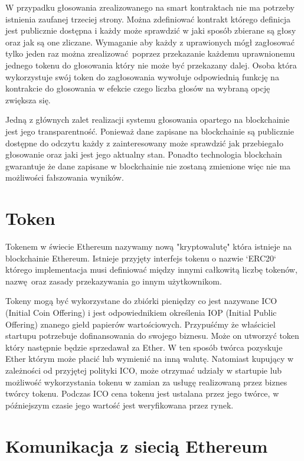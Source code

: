 \documentclass[]{llncs}
\begin{document}
  W przypadku głosowania zrealizowanego na smart kontraktach nie ma potrzeby
  istnienia zaufanej trzeciej strony. Można zdefiniować kontrakt którego
  definicja jest publicznie dostępna i każdy może sprawdzić w jaki sposób
  zbierane są głosy oraz jak są one zliczane. Wymaganie aby każdy z uprawionych
  mógł zagłosować tylko jeden raz można zrealizować poprzez przekazanie każdemu
  uprawnionemu jednego tokenu do głosowania który nie może być przekazany dalej.
  Osoba która wykorzystuje swój token do zagłosowania wywołuje odpowiednią
  funkcję na kontrakcie do głosowania w efekcie czego liczba głosów na wybraną
  opcję zwiększa się.

  Jedną z głównych zalet realizacji systemu głosowania opartego na blockchainie
  jest jego transparentność. Ponieważ dane zapisane na blockchainie są
  publicznie dostępne do odczytu każdy z zainteresowany może sprawdzić jak
  przebiegało głosowanie oraz jaki jest jego aktualny stan. Ponadto technologia
  blockchain gwarantuje że dane zapisane w blockchainie nie zostaną zmienione
  więc nie ma możliwości fałszowania wyników.

\section{Token}

  Tokenem w świecie Ethereum nazywamy nową "kryptowalutę" która istnieje na
  blockchainie Ethereum. Istnieje przyjęty interfejs tokenu o nazwie `ERC20`
  którego implementacja musi definiować między innymi całkowitą liczbę tokenów,
  nazwę oraz zasady przekazywania go innym użytkownikom.

  Tokeny mogą być wykorzystane do zbiórki pieniędzy co jest nazywane ICO
  (Initial Coin Offering) i jest odpowiednikiem określenia IOP (Initial Public
  Offering) znanego giełd papierów wartościowych. Przypuśćmy że właściciel
  startupu potrzebuje dofinansowania do swojego biznesu. Może on utworzyć token
  który następnie będzie sprzedawał za Ether. W ten sposób twórca pozyskuje
  Ether którym może płacić lub wymienić na inną walutę. Natomiast kupujący w
  zależności od przyjętej polityki ICO, może otrzymać udziały w startupie lub
  możliwość wykorzystania tokenu w zamian za usługę realizowaną przez biznes
  twórcy tokenu. Podczas ICO cena tokenu jest ustalana przez jego twórce, w
  późniejszym czasie jego wartość jest weryfikowana przez rynek.

\section{Komunikacja z siecią Ethereum}
\end{document}
